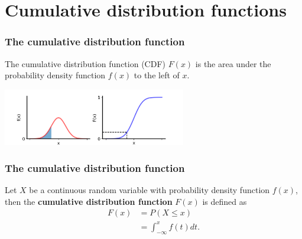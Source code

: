 \documentclass[10pt]{beamer}
\begin{document}
\section{Cumulative distribution functions}
\begin{frame}
\frametitle{The cumulative distribution function}

The cumulative distribution function (CDF) $F(x)$ is the area under the probability density function $f(x)$ to the left of $x$.

\begin{center}
\includegraphics[height=2.5cm]{images/pdf_cdf_1.png}
\end{center}


\end{frame}

\begin{frame}
\frametitle{The cumulative distribution function}


\vspace{.3cm}

\begin{definition} 
Let $X$ be a continuous random variable with probability density function $f(x)$, then the \textbf{cumulative distribution function} $F(x)$ is defined as
\begin{align*}
F(x) &= P(X \leq x)\\
&= \int_{-\infty}^x f(t) dt.
\end{align*} 
\end{definition}

\vspace{0.5cm}


\end{frame}
\end{document}
